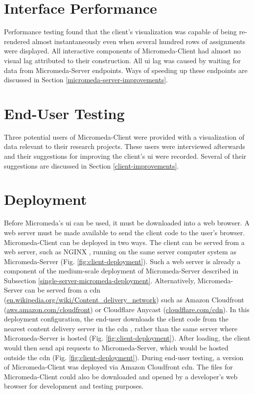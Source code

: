 \section{Interface Performance}

Performance testing found that the client's visualization was capable of being 
re-rendered almost instantaneously even when several hundred rows of assignments 
were displayed. All interactive components of Micromeda-Client had almost no 
visual lag attributed to their construction. All \gls{ui} lag was caused by 
waiting for data from Micromeda-Server endpoints. Ways of speeding up these 
endpoints are discussed in Section \ref{micromeda-server-improvements}.

\section{End-User Testing}

Three potential users of Micromeda-Client were provided with a visualization of 
data relevant to their research projects. These users were interviewed 
afterwards and their suggestions for improving the client's \gls{ui} were 
recorded. Several of their suggestions are discussed in Section 
\ref{client-improvements}. 

\section{Deployment}

Before Micromeda's \gls{ui} can be used, it must be downloaded into a web 
browser. A web server must be made available to send the client code to the 
user's browser. Micromeda-Client can be deployed in two ways. The client can be 
served from a web server, such as NGINX \cite{reese2008nginx}, running on the 
same server computer system as Micromeda-Server (Fig. 
\ref{fig:client-deployment}). Such a web server is already a component of the 
medium-scale deployment of Micromeda-Server described in Subsection 
\ref{single-server-micromeda-deployment}. Alternatively, Micromeda-Server can be 
served from a \gls{cdn} \cite{farber2003internet} 
(\href{http://en.wikipedia.org/wiki/Content_delivery_network}{en.wikipedia.org/wiki/Content\_delivery\_network}) 
such as Amazon Cloudfront \cite{varia2014overview} 
(\href{http://aws.amazon.com/cloudfront}{aws.amazon.com/cloudfront}) or 
Cloudflare Anycast \cite{calder2015analyzing} 
(\href{http://cloudflare.com/cdn}{cloudflare.com/cdn}). In this deployment 
configuration, the end-user downloads the client code from the nearest content 
delivery server in the \gls{cdn} , rather than the same server where 
Micromeda-Server is hosted (Fig. \ref{fig:client-deployment}). After loading, 
the client would then send \gls{api} requests to Micromeda-Server, which would 
be hosted outside the \gls{cdn}  (Fig. \ref{fig:client-deployment}). During 
end-user testing, a version of Micromeda-Client was deployed via Amazon 
Cloudfront \gls{cdn}. The files for Micromeda-Client could also be downloaded 
and opened by a developer's web browser for development and testing purposes.

